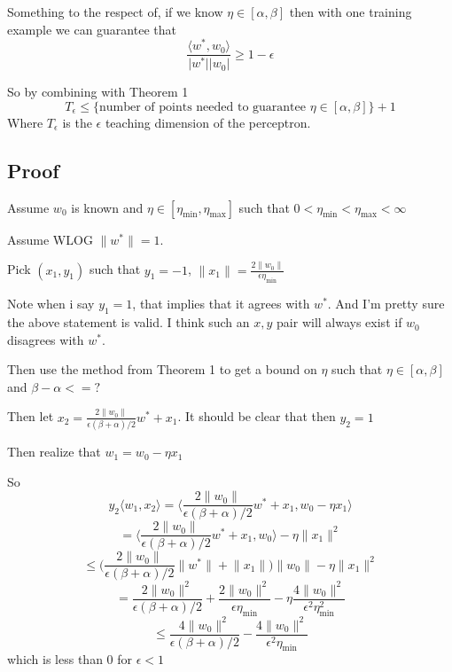 \documentclass{article}
\begin{document}
Something to the respect of, if we know $\eta \in [\alpha, \beta]$ then with one training example we can guarantee that
$$
\frac{\langle w^*, w_0 \rangle}{\lvert w^* \rvert \lvert w_0 \rvert} \geq 1 - \epsilon
$$

So by combining with Theorem 1
$$
T_\epsilon \leq \{\text{number of points needed to guarantee } \eta \in [\alpha, \beta]\} +1 
$$
Where $T_\epsilon$ is the $\epsilon$ teaching dimension of the perceptron.
\color{black}

\subsection*{Proof}


Assume $w_0$ is known and $\eta \in [\eta_{\min} , \eta_{\max}] $ such that 
$0 < \eta_{\min} < \eta_{\max} < \infty$

Assume WLOG $\lVert w^* \rVert = 1$.

Pick $(x_1,y_1)$ such that $y_1 = -1$, $\lVert x_1 \rVert = \frac{2 \lVert w_0 \rVert}{\epsilon \eta_{\min}}$

\color{red}
Note when i say $y_1 = 1$, that implies that it agrees with $w^*$. And I'm pretty 
sure the above statement is valid. I think such an $x,y$ pair will always exist if
$w_0$ disagrees with $w^*$.
\color{black}

Then use the method from Theorem 1 to get a bound on $\eta$ such that $\eta \in [\alpha , \beta]$ and $\beta - \alpha <= ?$

Then let $x_2 = \frac{2 \lVert w_0 \rVert}{\epsilon (\beta + \alpha)/2}w^* + x_1$.
It should be clear that then $y_2 = 1$

Then realize that
$w_1 = w_0 - \eta x_1$

So
$$
y_2 \langle w_1, x_2 \rangle  = \bigg\langle \frac{2 \lVert w_0 \rVert}{\epsilon (\beta + \alpha) /2} w^* + x_1 , w_0 - \eta x_1 \bigg\rangle
$$
$$
= \bigg\langle \frac{2 \lVert w_0 \rVert}{\epsilon (\beta + \alpha) /2} w^* + x_1 , w_0  \bigg\rangle - \eta \lVert x_1 \rVert^2
$$
$$
\leq \bigg( \frac{2 \lVert w_0 \rVert}{\epsilon (\beta + \alpha) /2} \lVert w^* \rVert + \lVert x_1 \rVert \bigg ) \lVert w_0 \rVert - \eta \lVert x_1 \rVert^2
$$
$$
= \frac{2 \lVert w_0 \rVert^2}{\epsilon (\beta + \alpha)/2} + \frac{2 \lVert w_0 \rVert ^2}{\epsilon \eta_{\min}} - \eta \frac{4 \lVert w_0 \rVert^2}{\epsilon^2 \eta_{\min}^2}
$$
$$
\leq \frac{4 \lVert w_0 \rVert^2}{\epsilon (\beta + \alpha)/2}  -  \frac{4 \lVert w_0 \rVert^2}{\epsilon^2 \eta_{\min}}
$$
which is less than $0$ for $\epsilon < 1$
\end{document}

